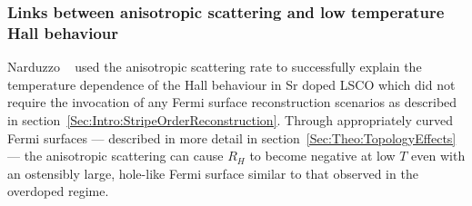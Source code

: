 
\subsubsection{Links between anisotropic scattering and low temperature Hall behaviour}

Narduzzo \etal~\cite{Narduzzo2008} used the anisotropic scattering rate to successfully explain the temperature dependence of the Hall behaviour in Sr doped \ac{LSCO} which did not require the invocation of any Fermi surface reconstruction scenarios as described in section~\ref{Sec:Intro:StripeOrderReconstruction}. Through appropriately curved Fermi surfaces --- described in more detail in section~\ref{Sec:Theo:TopologyEffects} --- the anisotropic scattering can cause $R_H$ to become negative at low $T$ even with an ostensibly large, hole-like Fermi surface similar to that observed in the overdoped regime.






